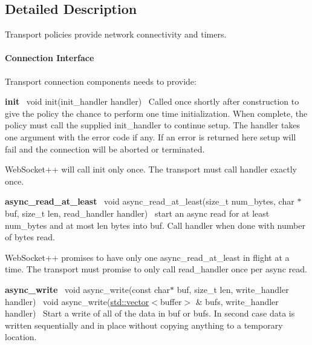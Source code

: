 \subsection{Detailed Description}
Transport policies provide network connectivity and timers. 

\paragraph*{Connection Interface}

Transport connection components needs to provide\+:

{\bfseries init}~\newline
{\ttfamily void init(init\+\_\+handler handler)}~\newline
Called once shortly after construction to give the policy the chance to perform one time initialization. When complete, the policy must call the supplied {\ttfamily init\+\_\+handler} to continue setup. The handler takes one argument with the error code if any. If an error is returned here setup will fail and the connection will be aborted or terminated.

Web\+Socket++ will call init only once. The transport must call {\ttfamily handler} exactly once.

{\bfseries async\+\_\+read\+\_\+at\+\_\+least}~\newline
{\ttfamily void async\+\_\+read\+\_\+at\+\_\+least(size\+\_\+t num\+\_\+bytes, char $\ast$buf, size\+\_\+t len, read\+\_\+handler handler)}~\newline
start an async read for at least num\+\_\+bytes and at most len bytes into buf. Call handler when done with number of bytes read.

Web\+Socket++ promises to have only one async\+\_\+read\+\_\+at\+\_\+least in flight at a time. The transport must promise to only call read\+\_\+handler once per async read.

{\bfseries async\+\_\+write}~\newline
{\ttfamily void async\+\_\+write(const char$\ast$ buf, size\+\_\+t len, write\+\_\+handler handler)}~\newline
{\ttfamily void async\+\_\+write(\mbox{\hyperlink{classstd_1_1vector}{std\+::vector}}$<$buffer$>$ \& bufs, write\+\_\+handler handler)}~\newline
Start a write of all of the data in buf or bufs. In second case data is written sequentially and in place without copying anything to a temporary location.

